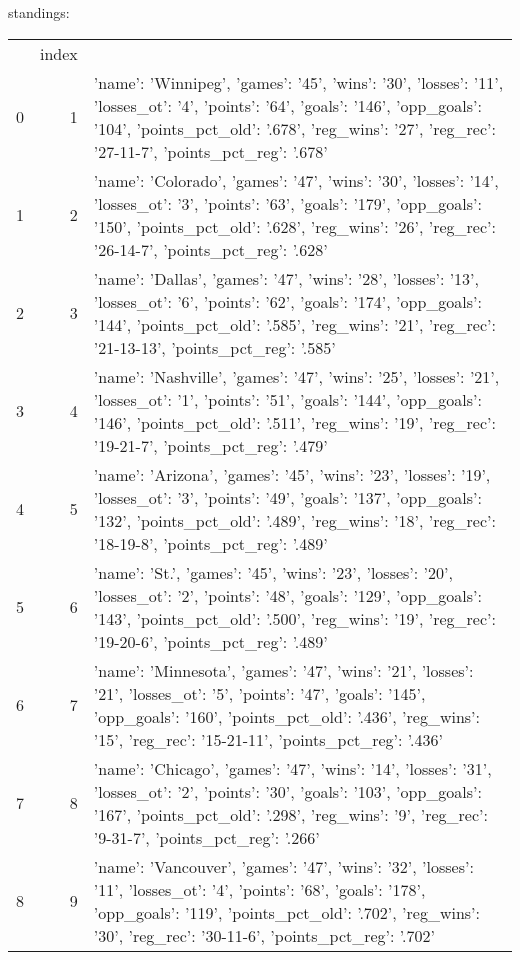 {} standings:
\begin{tabular}{lrl}
 & index &  \\
0 & 1 & {'name': 'Winnipeg', 'games': '45', 'wins': '30', 'losses': '11', 'losses_ot': '4', 'points': '64', 'goals': '146', 'opp_goals': '104', 'points_pct_old': '.678', 'reg_wins': '27', 'reg_rec': '27-11-7', 'points_pct_reg': '.678'} \\
1 & 2 & {'name': 'Colorado', 'games': '47', 'wins': '30', 'losses': '14', 'losses_ot': '3', 'points': '63', 'goals': '179', 'opp_goals': '150', 'points_pct_old': '.628', 'reg_wins': '26', 'reg_rec': '26-14-7', 'points_pct_reg': '.628'} \\
2 & 3 & {'name': 'Dallas', 'games': '47', 'wins': '28', 'losses': '13', 'losses_ot': '6', 'points': '62', 'goals': '174', 'opp_goals': '144', 'points_pct_old': '.585', 'reg_wins': '21', 'reg_rec': '21-13-13', 'points_pct_reg': '.585'} \\
3 & 4 & {'name': 'Nashville', 'games': '47', 'wins': '25', 'losses': '21', 'losses_ot': '1', 'points': '51', 'goals': '144', 'opp_goals': '146', 'points_pct_old': '.511', 'reg_wins': '19', 'reg_rec': '19-21-7', 'points_pct_reg': '.479'} \\
4 & 5 & {'name': 'Arizona', 'games': '45', 'wins': '23', 'losses': '19', 'losses_ot': '3', 'points': '49', 'goals': '137', 'opp_goals': '132', 'points_pct_old': '.489', 'reg_wins': '18', 'reg_rec': '18-19-8', 'points_pct_reg': '.489'} \\
5 & 6 & {'name': 'St.', 'games': '45', 'wins': '23', 'losses': '20', 'losses_ot': '2', 'points': '48', 'goals': '129', 'opp_goals': '143', 'points_pct_old': '.500', 'reg_wins': '19', 'reg_rec': '19-20-6', 'points_pct_reg': '.489'} \\
6 & 7 & {'name': 'Minnesota', 'games': '47', 'wins': '21', 'losses': '21', 'losses_ot': '5', 'points': '47', 'goals': '145', 'opp_goals': '160', 'points_pct_old': '.436', 'reg_wins': '15', 'reg_rec': '15-21-11', 'points_pct_reg': '.436'} \\
7 & 8 & {'name': 'Chicago', 'games': '47', 'wins': '14', 'losses': '31', 'losses_ot': '2', 'points': '30', 'goals': '103', 'opp_goals': '167', 'points_pct_old': '.298', 'reg_wins': '9', 'reg_rec': '9-31-7', 'points_pct_reg': '.266'} \\
8 & 9 & {'name': 'Vancouver', 'games': '47', 'wins': '32', 'losses': '11', 'losses_ot': '4', 'points': '68', 'goals': '178', 'opp_goals': '119', 'points_pct_old': '.702', 'reg_wins': '30', 'reg_rec': '30-11-6', 'points_pct_reg': '.702'} \\

\end{tabular}
